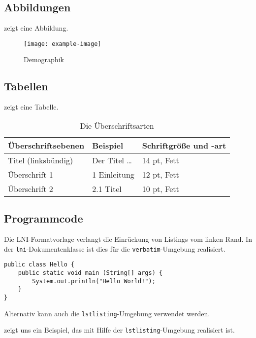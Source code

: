 \documentclass[utf8,biblatex]{lni}
\begin{document}
    \subsection{Abbildungen}
     zeigt eine Abbildung.

    \begin{figure}
        \centering
        \texttt{[image: example-image]}
        \caption{Demographik}
        \label{fig:demo}
    \end{figure}

    \subsection{Tabellen}
     zeigt eine Tabelle.

    \begin{table}
        \centering
        \begin{tabular}{lll}
            \toprule
            Überschriftsebenen & Beispiel & Schriftgröße und -art \\
            \midrule
            Titel (linksbündig) & Der Titel \ldots & 14 pt, Fett\\
            Überschrift 1 & 1 Einleitung & 12 pt, Fett\\
            Überschrift 2 & 2.1 Titel & 10 pt, Fett\\
            \bottomrule
        \end{tabular}
        \caption{Die Überschriftsarten}
        \label{tab:demo}
    \end{table}

    \subsection{Programmcode}
    Die LNI-Formatvorlage verlangt die Einrückung von Listings vom linken Rand.
    In der \texttt{lni}-Dokumentenklasse ist dies für die \texttt{verbatim}-Umgebung realisiert.

    \begin{verbatim}
public class Hello {
    public static void main (String[] args) {
        System.out.println("Hello World!");
    }
}
    \end{verbatim}

    Alternativ kann auch die \texttt{lstlisting}-Umgebung verwendet werden.

     zeigt uns ein Beispiel, das mit Hilfe der \texttt{lstlisting}-Umgebung realisiert ist.
\end{document}
